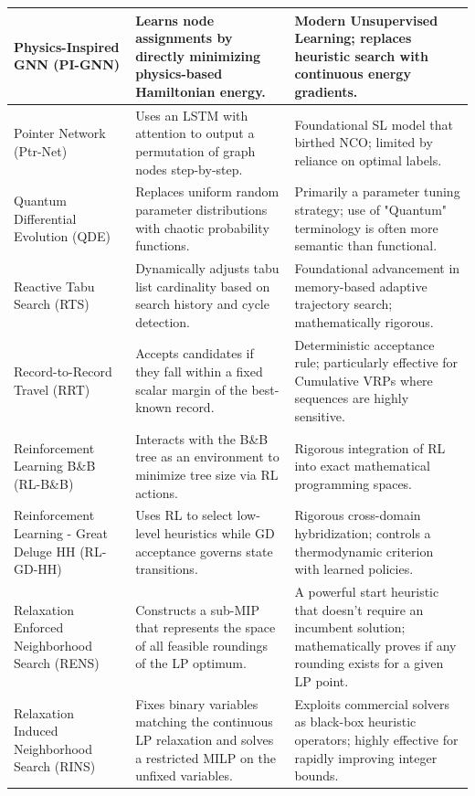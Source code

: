 \documentclass[orivec,runningheads]{llncs}
\begin{document}
\begin{center}
\begin{longtable}
\begin{center}
\begin{longtable}{
  >{\raggedright\arraybackslash}p{}
  >{\raggedright\arraybackslash}p{}
  >{\raggedright\arraybackslash}p{}
}
Physics-Inspired GNN (PI-GNN) & Learns node assignments by directly minimizing physics-based Hamiltonian energy. & Modern Unsupervised Learning; replaces heuristic search with continuous energy gradients. \\ \midrule

Pointer Network (Ptr-Net) & Uses an LSTM with attention to output a permutation of graph nodes step-by-step. & Foundational SL model that birthed NCO; limited by reliance on optimal labels. \\ \midrule

Quantum Differential Evolution (QDE) & Replaces uniform random parameter distributions with chaotic probability functions. & Primarily a parameter tuning strategy; use of "Quantum" terminology is often more semantic than functional. \\ \midrule

Reactive Tabu Search (RTS) & Dynamically adjusts tabu list cardinality based on search history and cycle detection. & Foundational advancement in memory-based adaptive trajectory search; mathematically rigorous. \\ \midrule

Record-to-Record Travel (RRT) & Accepts candidates if they fall within a fixed scalar margin of the best-known record. & Deterministic acceptance rule; particularly effective for Cumulative VRPs where sequences are highly sensitive. \\ \midrule

Reinforcement Learning B\&B (RL-B\&B) & Interacts with the B\&B tree as an environment to minimize tree size via RL actions. & Rigorous integration of RL into exact mathematical programming spaces. \\ \midrule

Reinforcement Learning - Great Deluge HH (RL-GD-HH) & Uses RL to select low-level heuristics while GD acceptance governs state transitions. & Rigorous cross-domain hybridization; controls a thermodynamic criterion with learned policies. \\ \midrule

Relaxation Enforced Neighborhood Search (RENS) & Constructs a sub-MIP that represents the space of all feasible roundings of the LP optimum. & A powerful start heuristic that doesn't require an incumbent solution; mathematically proves if any rounding exists for a given LP point. \\ \midrule

Relaxation Induced Neighborhood Search (RINS) & Fixes binary variables matching the continuous LP relaxation and solves a restricted MILP on the unfixed variables. & Exploits commercial solvers as black-box heuristic operators; highly effective for rapidly improving integer bounds. \\ \midrule


\end{longtable}
\end{center}
\end{longtable}
\end{center}
\end{document}

